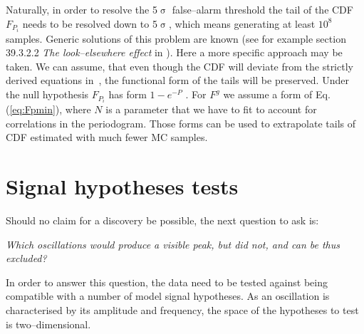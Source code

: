 Naturally, in order to resolve the 5$\upsigma$ false--alarm threshold the tail of the CDF$F_{P_i}$ needs to be resolved down to 5$\upsigma$, which means generating at least $10^8$ samples. Generic solutions of this problem are known (see for example section 39.3.2.2 \emph{The look--elsewhere effect} in \cite{PDG2016}). Here a more specific approach may be taken. We can assume, that even though the CDF will deviate from the strictly derived equations in~\cite{Scargle1982}, the functional form of the tails will be preserved. Under the null hypothesis $F_{P_i}$ has form $1 - e^{-P}$ \cite{Scargle1982}. For $F^g$ we assume a form of Eq.\,(\ref{eq:Fpmin}), where $N$ is a parameter that we have to fit to account for correlations in the periodogram. Those forms can be used to extrapolate tails of CDF estimated with much fewer MC samples.


%





\section{Signal hypotheses tests}
Should no claim for a discovery be possible, the next question to ask is:
\begin{center}
  \emph{Which oscillations would produce a visible peak, but did not, and can be thus excluded?}
\end{center}
In order to answer this question, the data need to be tested against being compatible with a number of model signal hypotheses. As an oscillation is characterised by its amplitude and frequency, the space of the hypotheses to test is two--dimensional.

